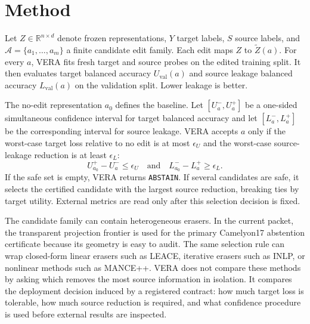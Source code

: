 \documentclass[letterpaper]{article}
\begin{document}
\section{Method}

Let $Z \in \mathbb{R}^{n \times d}$ denote frozen representations, $Y$ target
labels, $S$ source labels, and
$\mathcal{A}=\{a_1,\ldots,a_m\}$ a finite candidate edit family. Each edit
maps $Z$ to $\tilde Z(a)$. For every $a$, VERA fits fresh target and source
probes on the edited training split. It then evaluates target balanced
accuracy $U_{\mathrm{val}}(a)$ and source leakage balanced accuracy
$L_{\mathrm{val}}(a)$ on the validation split. Lower leakage is better.

The no-edit representation $a_0$ defines the baseline. Let
$[U^-_a,U^+_a]$ be a one-sided simultaneous confidence interval for target
balanced accuracy and let $[L^-_a,L^+_a]$ be the corresponding interval for
source leakage. VERA accepts $a$ only if the worst-case target loss relative to
no edit is at most $\epsilon_U$ and the worst-case source-leakage reduction is
at least $\epsilon_L$:
\[
U^+_{a_0}-U^-_a \le \epsilon_U
\quad\text{and}\quad
L^-_{a_0}-L^+_a \ge \epsilon_L .
\]
If the safe set is empty, VERA returns \texttt{ABSTAIN}. If several candidates
are safe, it selects the certified candidate with the largest source reduction,
breaking ties by target utility. External metrics are read only after this
selection decision is fixed.

The candidate family can contain heterogeneous erasers. In the current packet,
the transparent projection frontier is used for the primary Camelyon17
abstention certificate because its geometry is easy to audit. The same
selection rule can wrap closed-form linear erasers such as LEACE, iterative
erasers such as INLP, or nonlinear methods such as MANCE++. VERA does not
compare these methods by asking which removes the most source information in
isolation. It compares the deployment decision induced by a registered
contract: how much target loss is tolerable, how much source reduction is
required, and what confidence procedure is used before external results are
inspected.
\end{document}
